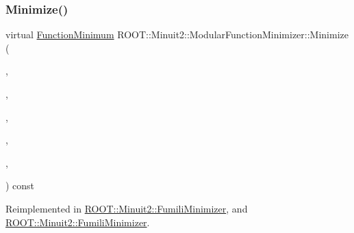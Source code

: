 \subsubsection{\texorpdfstring{Minimize()}{Minimize()}\hspace{0.1cm}{\footnotesize\ttfamily [21/22]}}
{\footnotesize\ttfamily virtual \mbox{\hyperlink{classROOT_1_1Minuit2_1_1FunctionMinimum}{Function\+Minimum}} R\+O\+O\+T\+::\+Minuit2\+::\+Modular\+Function\+Minimizer\+::\+Minimize (\begin{DoxyParamCaption}\item[{const \mbox{\hyperlink{classROOT_1_1Minuit2_1_1MnFcn}{Mn\+Fcn}} \&}]{,  }\item[{const \mbox{\hyperlink{classROOT_1_1Minuit2_1_1GradientCalculator}{Gradient\+Calculator}} \&}]{,  }\item[{const \mbox{\hyperlink{classROOT_1_1Minuit2_1_1MinimumSeed}{Minimum\+Seed}} \&}]{,  }\item[{const \mbox{\hyperlink{classROOT_1_1Minuit2_1_1MnStrategy}{Mn\+Strategy}} \&}]{,  }\item[{unsigned int}]{,  }\item[{double}]{ }\end{DoxyParamCaption}) const\hspace{0.3cm}{\ttfamily [virtual]}}



Reimplemented in \mbox{\hyperlink{classROOT_1_1Minuit2_1_1FumiliMinimizer_ace396e586a17ad934f18b32c8ddd054a}{R\+O\+O\+T\+::\+Minuit2\+::\+Fumili\+Minimizer}}, and \mbox{\hyperlink{classROOT_1_1Minuit2_1_1FumiliMinimizer_ace396e586a17ad934f18b32c8ddd054a}{R\+O\+O\+T\+::\+Minuit2\+::\+Fumili\+Minimizer}}.

\mbox{\label{classROOT_1_1Minuit2_1_1ModularFunctionMinimizer_ac2b4ce9fa735f5014f610fd0374c58e4}} 
